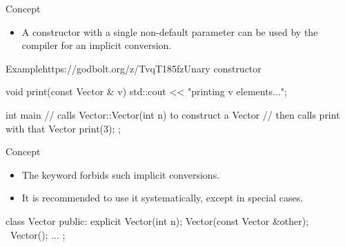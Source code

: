 \begin{frame}[fragile]
  \begin{block}{Concept}
    \begin{itemize}
    \item A constructor with a single non-default parameter can be used by the compiler for an implicit conversion.
    \end{itemize}
  \end{block}
  \begin{exampleblockGB}{Example}{https://godbolt.org/z/TvqT185fz}{Unary constructor}
    \begin{cppcode}
    void print(const Vector & v) {
      std::cout << "printing v elements...\n";
    }

    int main {
      // calls Vector::Vector(int n) to construct a Vector
      // then calls print with that Vector
      print(3);
    };
    \end{cppcode}
  \end{exampleblockGB}
\end{frame}

\begin{frame}[fragile]
  \begin{block}{Concept}
    \begin{itemize}
      \item The keyword  forbids such implicit conversions.
      \item It is recommended to use it systematically, except in special cases.
    \end{itemize}
  \end{block}
  \begin{cppcode}
    class Vector {
    public:
      explicit Vector(int n);
      Vector(const Vector &other);
      ~Vector();
      ...
    };
  \end{cppcode}
\end{frame}

